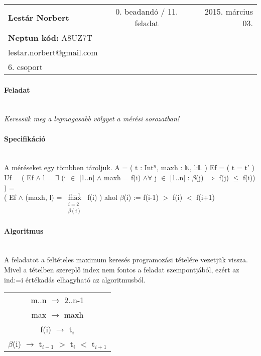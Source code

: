 \documentclass[12pt]{report}
\begin{document}
\begin{tabular}{lcr}
\textbf{Lestár Norbert} & 0. beadandó / 11. feladat  & 2015. március 03. \\
\textbf{Neptun kód:} A8UZ7T \\
lestar.norbert@gmail.com \\
6. csoport \\
\end{tabular}
\paragraph{Feladat} \hspace{0pt} \\
\textit{Keressük meg a legmagasabb völgyet a mérési sorozatban!}
\paragraph{Specifikáció} \hspace{0pt} \\
A méréseket egy tömbben tároljuk. \newline
A = ( t : Int$^{n}$, maxh : $\mathbb{N}$, l:$\mathbb{L}$ ) \newline
Ef = ( t = t' ) \newline
Uf = ( Ef $\wedge$ l = $\exists$ (i $\in$ [1..n] $\wedge$ maxh = f(i) $\wedge \forall$ j $\in$ [1..n] : $\beta$(j) $\Rightarrow$ f(j) $\leq$ f(i)) ) = \\ ( Ef $\wedge$ (maxh, l) = $\max\limits_{\substack{i=2 \\ \beta(i)}}^{n-1}$ f(i) ) \newline
ahol $\beta$(i) := f(i-1) $>$ f(i) $<$ f(i+1)
\paragraph{Algoritmus} \hspace{0pt} \\
A feladatot a feltételes maximum keresés programozási tételére vezetjük vissza. Mivel a tételben szereplő index nem fontos a feladat szempontjából, ezért az ind:=i értékadás elhagyható az algoritmusból. \newline
\begin{tabular}{c}
m..n $\rightarrow$ 2..n-1 \\
max $\rightarrow$ maxh \\
f(i) $\rightarrow$ t$_{i}$ \\
$\beta$(i) $\rightarrow$ t$_{i-1}$ $>$ t$_{i}$ $<$ t$_{i+1}$
\end{tabular}
\end{document}
